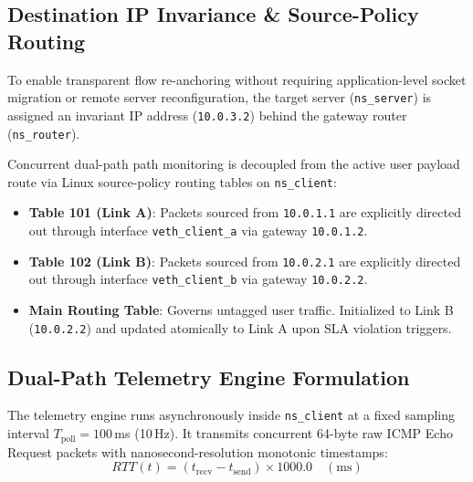\subsection{Destination IP Invariance \& Source-Policy Routing}
\label{subsec:policy_routing}

To enable transparent flow re-anchoring without requiring application-level socket migration or remote server reconfiguration, the target server (\texttt{ns\_server}) is assigned an invariant IP address (\texttt{10.0.3.2}) behind the gateway router (\texttt{ns\_router}). 

Concurrent dual-path path monitoring is decoupled from the active user payload route via Linux source-policy routing tables on \texttt{ns\_client}:
\begin{itemize}
    \item \textbf{Table 101 (Link A)}: Packets sourced from \texttt{10.0.1.1} are explicitly directed out through interface \texttt{veth\_client\_a} via gateway \texttt{10.0.1.2}.
    \item \textbf{Table 102 (Link B)}: Packets sourced from \texttt{10.0.2.1} are explicitly directed out through interface \texttt{veth\_client\_b} via gateway \texttt{10.0.2.2}.
    \item \textbf{Main Routing Table}: Governs untagged user traffic. Initialized to Link B (\texttt{10.0.2.2}) and updated atomically to Link A upon SLA violation triggers.
\end{itemize}

\subsection{Dual-Path Telemetry Engine Formulation}
\label{subsec:telemetry_engine}

The telemetry engine runs asynchronously inside \texttt{ns\_client} at a fixed sampling interval $T_{\text{poll}} = 100$\,ms (10\,Hz). It transmits concurrent 64-byte raw ICMP Echo Request packets with nanosecond-resolution monotonic timestamps:
\begin{equation}
RTT(t) = (t_{\text{recv}} - t_{\text{send}}) \times 1000.0 \quad (\text{ms})
\end{equation}

